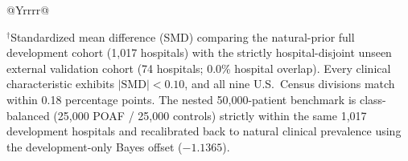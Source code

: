 \begin{table}[t]
\begin{tabularx}{\textwidth}{@{}Yrrrr@{}}
\bottomrule
\end{tabularx}
\par\smallskip\raggedright\fontsize{7.5}{9.4}\selectfont\color{sub}
$^{\dagger}$Standardized mean difference (SMD) comparing the natural-prior full development cohort (1,017 hospitals) with the strictly hospital-disjoint unseen external validation cohort (74 hospitals; 0.0\% hospital overlap). Every clinical characteristic exhibits $|\mathrm{SMD}| < 0.10$, and all nine U.S.\ Census divisions match within 0.18 percentage points. The nested 50,000-patient benchmark is class-balanced (25,000 POAF / 25,000 controls) strictly within the same 1,017 development hospitals and recalibrated back to natural clinical prevalence using the development-only Bayes offset ($-1.1365$).
\end{table}
